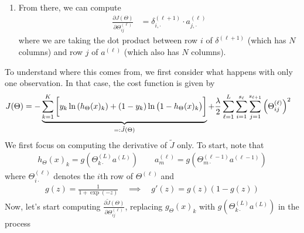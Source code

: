 \documentclass[12pt]{article}
\begin{document}
\begin{enumerate}
\begin{enumerate}
      \item From there, we can compute
        \begin{align*}
          \frac{\partial J(\Theta)}{\partial \Theta^{(\ell)}_{ij}}
          &=
          \delta^{(\ell+1)}_{i,\cdot}
          \cdot
          a^{(\ell)}_{j,\cdot}
        \end{align*}
        where we are taking the dot product between row $i$ of
        $\delta^{(\ell+1)}$ (which has $N$ columns) and row $j$ of
        $a^{(\ell)}$ (which also has $N$ columns).
    \end{enumerate}
\end{enumerate}
To understand where this comes from, we first consider what happens with
only one observation. In that case, the cost function is given by
\begin{align*}
  J(\Theta)
  &=
  -
  \underbrace{%
  \sum^K_{k=1}
  \bigg[
    y_k
    \ln \left( h_\Theta(x)_k \right)
    +
    (1-y_k)
    \ln \big(1-h_\Theta(x)_k\big)
  \bigg]
  }_{=:\tilde{J}(\Theta)}
  +
  \frac{\lambda}{2}
  \sum^{L}_{\ell=1} \sum^{s_\ell}_{i=1}
   \sum^{s_{\ell+1}}_{j=1} \left(\Theta^{(\ell)}_{ij}\right)^2
\end{align*}
We first focus on computing the derivative of $\tilde{J}$ only.
To start, note that
\begin{align*}
  h_{\Theta}(x)_k
  = g\left(\Theta_{k\cdot}^{(L)}a^{(L)}\right)
  \qquad
  a^{(\ell)}_m
  = g\left(\Theta^{(\ell-1)}_{m\cdot}a^{(\ell-1)}\right)
\end{align*}
where $\Theta_{i\cdot}^{(\ell)}$ denotes the $i$th row of
$\Theta^{(\ell)}$ and
\begin{align}
  g(z) = \frac{1}{1+\exp(-z)}
  \quad
  \implies\quad
  g'(z) = g(z)(1-g(z))
  \label{logisticderiv}
\end{align}
Now, let's start computing
$\frac{\partial \tilde{J}(\Theta)}{\partial \Theta^{(\ell)}_{ij}}$,
replacing $g_\Theta(x)_k$ with
$g\left(\Theta_{k\cdot}^{(L)}a^{(L)}\right)$ in the process
\end{document}
